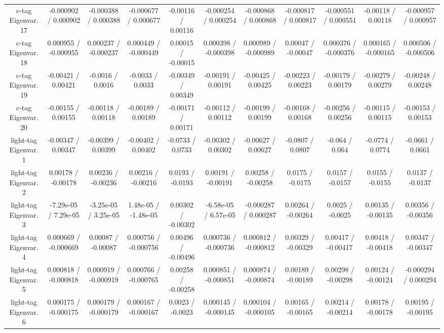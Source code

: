 \begin{table}[htbp]
\begin{center}
\begin{tabular}{|c|c|c|c|c|c|c|c|c|c|c|}
  c-tag Eigenvar. 17 & -0.000902 / 0.000902 & -0.000388 / 0.000388 & -0.000677 / 0.000677 & -0.00116 / 0.00116 & -0.000254 / 0.000254 & -0.000868 / 0.000868 & -0.000817 / 0.000817 & -0.000551 / 0.000551 & -0.00118 / 0.00118 & -0.000957 / 0.000957 \\ 
  c-tag Eigenvar. 18 & 0.000955 / -0.000955 & 0.000237 / -0.000237 & 0.000449 / -0.000449 & 0.00015 / -0.00015 & 0.000398 / -0.000398 & 0.000989 / -0.000989 & 0.00047 / -0.00047 & 0.000376 / -0.000376 & 0.000165 / -0.000165 & 0.000506 / -0.000506 \\ 
  c-tag Eigenvar. 19 & -0.00421 / 0.00421 & -0.0016 / 0.0016 & -0.0033 / 0.0033 & -0.00349 / 0.00349 & -0.00191 / 0.00191 & -0.00425 / 0.00425 & -0.00223 / 0.00223 & -0.00179 / 0.00179 & -0.00279 / 0.00279 & -0.00248 / 0.00248 \\ 
  c-tag Eigenvar. 20 & -0.00155 / 0.00155 & -0.00118 / 0.00118 & -0.00189 / 0.00189 & -0.00171 / 0.00171 & -0.00112 / 0.00112 & -0.00199 / 0.00199 & -0.00168 / 0.00168 & -0.00256 / 0.00256 & -0.00115 / 0.00115 & -0.00153 / 0.00153 \\ 
  light-tag Eigenvar. 1 & -0.00347 / 0.00347 & -0.00399 / 0.00399 & -0.00402 / 0.00402 & -0.0733 / 0.0733 & -0.00302 / 0.00302 & -0.00627 / 0.00627 & -0.0807 / 0.0807 & -0.064 / 0.064 & -0.0774 / 0.0774 & -0.0661 / 0.0661 \\ 
  light-tag Eigenvar. 2 & 0.00178 / -0.00178 & 0.00236 / -0.00236 & 0.00216 / -0.00216 & 0.0193 / -0.0193 & 0.00191 / -0.00191 & 0.00258 / -0.00258 & 0.0175 / -0.0175 & 0.0157 / -0.0157 & 0.0155 / -0.0155 & 0.0137 / -0.0137 \\ 
  light-tag Eigenvar. 3 & -7.29e-05 / 7.29e-05 & -3.25e-05 / 3.25e-05 & 1.48e-05 / -1.48e-05 & 0.00302 / -0.00302 & -6.58e-05 / 6.57e-05 & -0.000287 / 0.000287 & 0.00264 / -0.00264 & 0.0025 / -0.0025 & 0.00135 / -0.00135 & 0.00356 / -0.00356 \\ 
  light-tag Eigenvar. 4 & 0.000669 / -0.000669 & 0.00087 / -0.00087 & 0.000756 / -0.000756 & 0.00496 / -0.00496 & 0.000736 / -0.000736 & 0.000812 / -0.000812 & 0.00329 / -0.00329 & 0.00417 / -0.00417 & 0.00418 / -0.00418 & 0.00347 / -0.00347 \\ 
  light-tag Eigenvar. 5 & 0.000818 / -0.000818 & 0.000919 / -0.000919 & 0.000766 / -0.000765 & 0.00258 / -0.00258 & 0.000851 / -0.000851 & 0.000874 / -0.000874 & 0.00189 / -0.00189 & 0.00298 / -0.00298 & 0.00124 / -0.00124 & -0.000294 / 0.000294 \\ 
  light-tag Eigenvar. 6 & 0.000175 / -0.000175 & 0.000179 / -0.000179 & 0.000167 / -0.000167 & 0.0023 / -0.0023 & 0.000145 / -0.000145 & 0.000104 / -0.000105 & 0.00165 / -0.00165 & 0.00214 / -0.00214 & 0.00178 / -0.00178 & 0.00195 / -0.00195 \\ 

\end{tabular}
\end{center}
\end{table}
